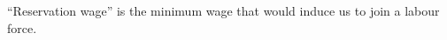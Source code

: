 \documentclass{article}
\begin{document}
\begin{spacing}{1.2}
    \newpage
``Reservation wage'' is the minimum wage that would induce us to join a labour force. 
\end{spacing}
\end{document}
